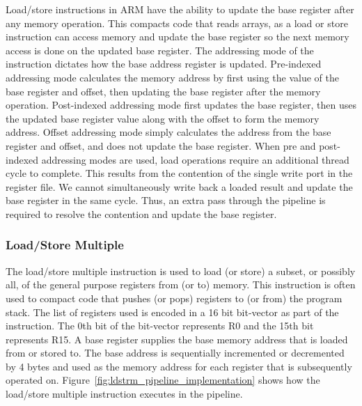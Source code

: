 Load/store instructions in ARM have the ability to update the base register after any memory operation. 
This compacts code that reads arrays, as a load or store instruction can access memory and update the base register so the next memory access is done on the updated base register.
The addressing mode of the instruction dictates how the base address register is updated. 
Pre-indexed addressing mode calculates the memory address by first using the value of the base register and offset, then updating the base register after the memory operation. 
Post-indexed addressing mode first updates the base register, then uses the updated base register value along with the offset to form the memory address.
Offset addressing mode simply calculates the address from the base register and offset, and does not update the base register. 
When pre and post-indexed addressing modes are used, load operations require an additional thread cycle to complete.
This results from the contention of the single write port in the register file. 
We cannot simultaneously write back a loaded result and update the base register in the same cycle.
Thus, an extra pass through the pipeline is required to resolve the contention and update the base register. 

\subsubsection{Load/Store Multiple}
The load/store multiple instruction is used to load (or store) a subset, or possibly all, of the general purpose registers from (or to) memory.
This instruction is often used to compact code that pushes (or pops) registers to (or from) the program stack.
The list of registers used is encoded in a 16 bit bit-vector as part of the instruction.
The 0th bit of the bit-vector represents R0 and the 15th bit represents R15.
A base register supplies the base memory address that is loaded from or stored to.
The base address is sequentially incremented or decremented by 4 bytes and used as the memory address for each register that is subsequently operated on. 
Figure~\ref{fig:ldstrm_pipeline_implementation} shows how the load/store multiple instruction executes in the pipeline. 

